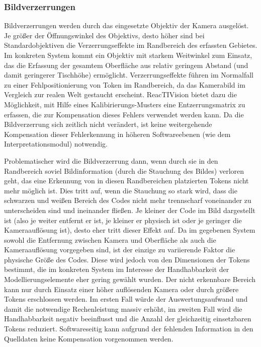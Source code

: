 
\subsubsection{Bildverzerrungen} %
\label{ssub:bildverzerrungen}

Bildverzerrungen werden durch das eingesetzte Objektiv der Kamera ausgelöst. Je größer der Öffnungswinkel des Objektivs, desto höher sind bei Standardobjektiven die Verzerrungseffekte im Randbereich des erfassten Gebietes. Im konkreten System kommt ein Objektiv mit starkem Weitwinkel zum Einsatz, das die Erfassung der gesamtem Oberfläche aus relativ geringem Abstand (und damit geringerer Tischhöhe) ermöglicht. Verzerrungseffekte führen im Normalfall zu einer Fehlpositionierung von Token im Randbereich, da das Kamerabild im Vergleich zur realen Welt gestaucht erscheint. ReacTIVision bietet dazu die Möglichkeit, mit Hilfe eines Kalibirierungs-Musters eine Entzerrungsmatrix zu erfassen, die zur Kompensation dieses Fehlers verwendet werden kann. Da die Bildverzerrung sich zeitlich nicht verändert, ist keine weitergehende Kompensation dieser Fehlerkennung in höheren Softwareebenen (wie dem Interpretationsmodul) notwendig.

Problematischer wird die Bildverzerrung dann, wenn durch sie in den Randbereich soviel Bildinformation (durch die Stauchung des Bildes) verloren geht, das eine Erkennung von in diesen Randbereichen platzierten Tokens nicht mehr möglich ist. Dies tritt auf, wenn die Stauchung so stark wird, dass die schwarzen und weißen Bereich des Codes nicht mehr trennscharf voneinander zu unterscheiden sind und ineinander fließen. Je kleiner der Code im Bild dargestellt ist (also je weiter entfernt er ist, je kleiner er physisch ist oder je geringer die Kameraauflösung ist), desto eher tritt dieser Effekt auf. Da im gegebenen System sowohl die Entfernung zwischen Kamera und Oberfläche als auch die Kameraauflösung vorgegeben sind, ist der einzige zu variierende Faktor die physische Größe des Codes. Diese wird jedoch von den Dimensionen der Tokens bestimmt, die im konkreten System im Interesse der Handhabbarkeit der Modellierungselemente eher gering gewählt wurden. Der nicht erkennbare Bereich kann nur durch Einsatz einer höher auflösenden Kamera oder durch größere Tokens erschlossen werden. Im ersten Fall würde der Auswertungsaufwand und damit die notwendige Rechenleistung massiv erhöht, im zweiten Fall wird die Handhabbarkeit negativ beeinflusst und die Anzahl der gleichzeitig einsetzbaren Tokens reduziert. Softwareseitig kann aufgrund der fehlenden Information in den Quelldaten keine Kompensation vorgenommen werden.

